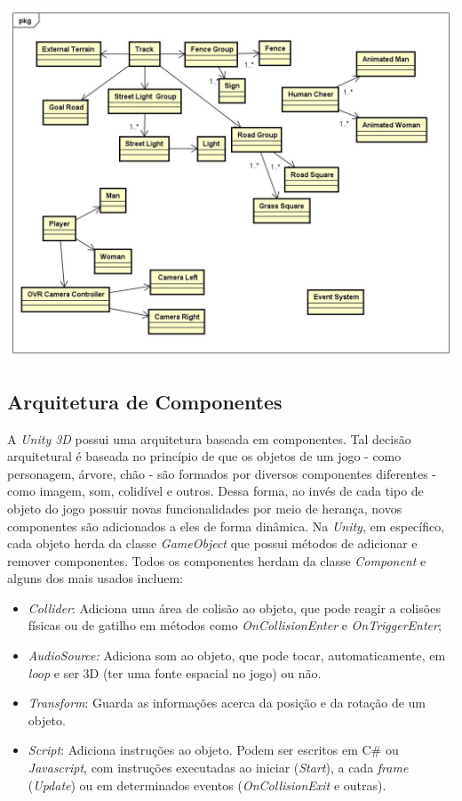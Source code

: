 \begin{center}
	\includegraphics[scale=0.5]{figuras/main_domain}
	\label{figura:main_domain}
\end{center}

\subsection{Arquitetura de Componentes}

A \textit{Unity 3D} possui uma arquitetura baseada em componentes. Tal decisão arquitetural é baseada no princípio de que os objetos de um jogo - como personagem, árvore, chão - são formados por diversos componentes diferentes - como imagem, som, colidível e outros. Dessa forma, ao invés de cada tipo de objeto do jogo possuir novas funcionalidades por meio de herança, novos componentes são adicionados a eles de forma dinâmica. Na \textit{Unity}, em específico, cada objeto herda da classe \textit{GameObject} que possui métodos de adicionar e remover componentes. Todos os componentes herdam da classe \textit{Component} e alguns dos mais usados incluem:

\begin{itemize}
\item \textit{Collider}: Adiciona uma área de colisão ao objeto, que pode reagir a colisões físicas ou de gatilho em métodos como \textit{OnCollisionEnter} e \textit{OnTriggerEnter};
\item \textit{AudioSource:} Adiciona som ao objeto, que pode tocar, automaticamente, em \textit{loop} e ser 3D (ter uma fonte espacial no jogo) ou não.
\item \textit{Transform}: Guarda as informações acerca da posição e da rotação de um objeto.
\item \textit{Script}: Adiciona instruções ao objeto. Podem ser escritos em C\# ou \textit{Javascript}, com instruções executadas ao iniciar (\textit{Start}), a cada \textit{frame} (\textit{Update}) ou em determinados eventos (\textit{OnCollisionExit} e outras).
\end{itemize}

